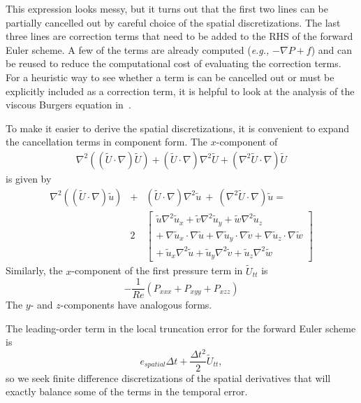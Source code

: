 \documentclass[fleqn,12pt,twoside]{article}
\def\eg{\emph{e.g., }}
\newcommand{\beq}{\begin{equation}}
\newcommand{\eeq}{\end{equation}}
\newcommand{\bea}{\begin{eqnarray}}
\newcommand{\eea}{\end{eqnarray}}
\def\div{\ensuremath{\nabla \cdot}}
\def\grad{\ensuremath{\nabla}}
\def\lapl{\ensuremath{\nabla^2}}
\def\tU{\tilde{U}}
\def\tu{\tilde{u}}
\def\tv{\tilde{v}}
\def\tw{\tilde{w}}
\def\dt{\Delta t}
\begin{document}
This expression looks messy, but it turns out that the first two lines
can be partially cancelled out by careful choice of the spatial 
discretizations.  The last three lines are correction terms that need
to be added to the RHS of the forward Euler scheme.  A few of the terms 
are already computed (\eg $-\grad P + f$) and can be reused to reduce the
computational cost of evaluating the correction terms.  For a heuristic
way to see whether a term is can be cancelled out or must be explicitly 
included as a correction term, it is helpful to look at the analysis of 
the viscous Burgers equation in~\cite{chu_2009}.

To make it easier to derive the spatial discretizations, it is convenient
to expand the cancellation terms in component form.  The $x$-component 
of 
\bea
  \lapl \left( (\tU \cdot \grad) \tU \right)
  + \left(\tU \cdot \grad \right) \lapl \tU 
  + \left(\lapl \tU \cdot \grad \right) \tU 
\eea
is given by 
\bea
  \lapl \left( (\tU \cdot \grad) \tu \right)
  &+& \left(\tU \cdot \grad \right) \lapl \tu 
  \ + \ \left(\lapl \tU \cdot \grad \right) \tu =  
  \nonumber \\
  &2& \left[ 
  \begin{array}{c}
    \tu \lapl \tu_x + \tv \lapl \tu_y + \tw \lapl \tu_z \\
    + \ \grad \tu_x \cdot \grad \tu 
    + \grad \tu_y \cdot \grad \tv
    + \grad \tu_z \cdot \grad \tw \\
    + \ \tu_x \lapl \tu + \tu_y \lapl \tv + \tu_z \lapl \tw 
  \end{array}
  \right]
  \label{eq:u_temporal_error}
\eea
Similarly, the $x$-component of the first pressure term in $\tU_{tt}$ is
\beq
  -\frac{1}{Re} 
  \left( P_{xxx} + P_{xyy} + P_{xzz} \right)
  \label{eq:P_temporal_error}
\eeq
The $y$- and $z$-components have analogous forms.

The leading-order term in the local truncation error for the forward
Euler scheme is
\beq
 e_{spatial} \dt + \frac{\dt^2}{2} \tU_{tt},
\eeq
so we seek finite difference discretizations of the spatial derivatives that
will exactly balance some of the terms in the temporal error.
\end{document}
